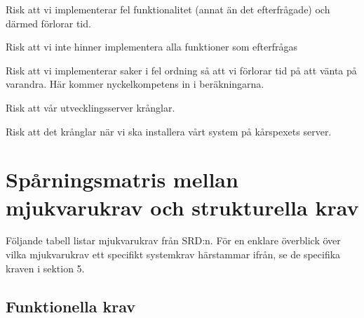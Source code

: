 \documentclass[a4paper, twoside, 11pt, titlepage]{article}
\begin{document}
	Risk att vi implementerar fel funktionalitet (annat än det efterfrågade) och därmed förlorar tid.

	Risk att vi inte hinner implementera alla funktioner som efterfrågas

	Risk att vi implementerar saker i fel ordning så att vi förlorar tid på att vänta på varandra. Här kommer nyckelkompetens in i beräkningarna.

	Risk att vår utvecklingsserver krånglar.

	Risk att det krånglar när vi ska installera vårt system på kårspexets server.

\clearpage
\section{Spårningsmatris mellan mjukvarukrav och strukturella krav}


Följande tabell listar mjukvarukrav från SRD:n. För en enklare överblick över vilka mjukvarukrav ett specifikt systemkrav härstammar ifrån, se de specifika kraven i sektion 5.

	\subsection{Funktionella krav}
\end{document}
